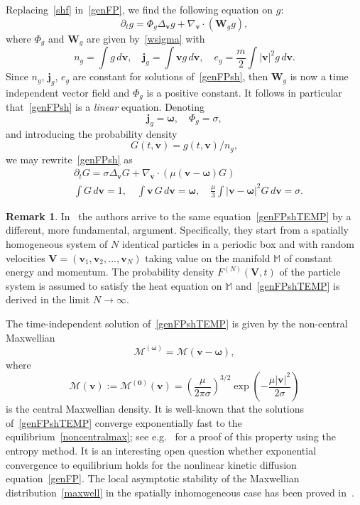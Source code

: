 \documentclass[12pt]{article}
\theoremstyle{definition}
\newtheorem*{remark}{Remark}
\numberwithin{equation}{section}
\begin{document}
Replacing~\eqref{shf} in~\eqref{genFP}, we find the following equation on $g$:
\begin{equation}\label{genFPsh}
\partial_tg=\Phi_{g}\Delta_{\bm v} g+\nabla_{\bm v}\cdot({\bm W}_{g}g),
\end{equation}
where $\Phi_g$ and ${\bm W}_g$ are given by~\eqref{wsigma} with
\[
n_g=\int g\,d{\bm v},\quad {\bm j}_g=\int {\bm v}g\,d{\bm v},\quad e_g=\frac{m}{2}\int |{\bm v}|^2g\,d{\bm v}.
\]
Since $n_g$, ${\bm j}_g$, $e_g$ are constant for solutions of~\eqref{genFPsh}, then ${\bm W}_g$ is now a time independent vector field and $\Phi_g$ is a positive constant. It follows in particular that~\eqref{genFPsh} is a {\it linear} equation. Denoting
\[
{\bm j}_g={\bm \omega},\quad \Phi_g=\sigma,
\]
and introducing the probability density 
\[
G(t,{\bm v})=g(t,{\bm v})/n_g,
\]
we may rewrite~\eqref{genFPsh} as
\begin{subequations}\label{genFPshTEMP}
\begin{align}
&\partial_t G=\sigma\Delta_{\bm v} G+\nabla_{\bm v}\cdot(\mu({\bm v}-{\bm \omega})G)\\
&\int  G\,d{\bm v}=1,\quad \int {\bm v}\,G\,d{\bm v}={\bm \omega},\quad \frac{\mu}{3}\int |{\bm v}-{\bm \omega}|^2G\,d{\bm v}=\sigma.
\end{align}
\end{subequations}
\begin{remark}\textnormal{
In~\cite{KL} the authors arrive to the same equation~\eqref{genFPshTEMP} by a different, more fundamental, argument. Specifically, they start from a spatially homogeneous system of $N$ identical particles in a periodic box and with random velocities ${\bm V}=({\bm v_1},{\bm v_2},\dots, {\bm v_N})$ taking value on the manifold $\mathbb{M}$ of constant energy and momentum. The probability density $F^{(N)}({\bm V}, t)$ of the particle system is assumed to satisfy the heat equation on $\mathbb{M}$ and~\eqref{genFPshTEMP} is derived in the limit $N\to\infty$. }
\end{remark}
The time-independent solution of~\eqref{genFPshTEMP} is given by the non-central Maxwellian 
\begin{equation}\label{noncentralmax}
\mathcal{M}^{({\bm \omega})}=\mathcal{M}({\bm v}-{\bm \omega}),
\end{equation}
where
\begin{equation}\label{maxwell}
\mathcal{M}({\bm v}):=\mathcal{M}^{({\bm 0})}({\bm v})=
\left(\frac{\mu}{2\pi \sigma}\right)^{3/2}\exp\left(-\frac{\mu|{\bm v}|^2}{2\sigma}\right)
\end{equation}
is the central Maxwellian density. 
It is well-known that the solutions of~\eqref{genFPshTEMP} converge exponentially fast to the equilibrium~\eqref{noncentralmax}; see e.g.~\cite{AMU} for a proof of this property using the entropy method. It is an interesting open question whether exponential convergence to equilibrium holds for the nonlinear kinetic diffusion equation~\eqref{genFP}. The local asymptotic stability of the Maxwellian distribution~\eqref{maxwell} in the spatially inhomogeneous case has been proved in~\cite{LY}.
\end{document}
